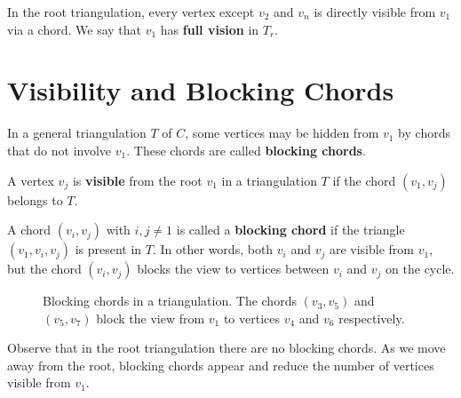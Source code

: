 In the root triangulation, every vertex except \(v_2\) and \(v_n\) is directly visible from \(v_1\) via a chord. 
We say that \(v_1\) has \textbf{full vision} in \(T_r\).

\section{Visibility and Blocking Chords}
\label{sec:visibility_blocking}

In a general triangulation \(T\) of \(C\), some vertices may be hidden from \(v_1\) by chords that do not involve \(v_1\). 
These chords are called \textbf{blocking chords}.

\begin{definition}
    A vertex \(v_j\) is \textbf{visible} from the root \(v_1\) in a triangulation \(T\) if the chord \((v_1, v_j)\) belongs to \(T\).
\end{definition}

\begin{definition}
    A chord \((v_i, v_j)\) with \(i, j \neq 1\) is called a \textbf{blocking chord} if the triangle \((v_1, v_i, v_j)\) is present in \(T\). 
    In other words, both \(v_i\) and \(v_j\) are visible from \(v_1\), but the chord \((v_i, v_j)\) blocks the view to vertices between \(v_i\) and \(v_j\) on the cycle.
\end{definition}

\begin{figure}[htbp]
    \centering
    \caption{Blocking chords in a triangulation. The chords \((v_3, v_5)\) and \((v_5, v_7)\) block the view from \(v_1\) to vertices \(v_4\) and \(v_6\) respectively.}
    \label{fig:blocking_chords}
\end{figure}

Observe that in the root triangulation there are no blocking chords. 
As we move away from the root, blocking chords appear and reduce the number of vertices visible from \(v_1\).

